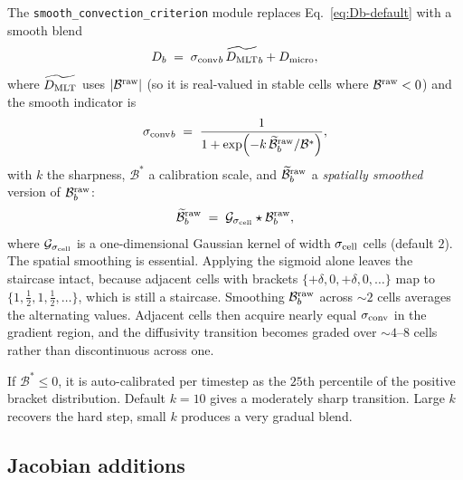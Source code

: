\documentclass{aastex631}
\newcommand{\Dmlt}{D_{\rm MLT}}
\newcommand{\Dmicro}{D_{\rm micro}}
\newcommand{\sigmaconv}{\sigma_{\rm conv}}
\newcommand{\bracketraw}{\mathcal{B}^{\rm raw}}
\newcommand{\bracketsm}{\widetilde{\mathcal{B}}^{\rm raw}}
\newcommand{\bracketstar}{\mathcal{B}^{*}}
\begin{document}
The \texttt{smooth\_convection\_criterion} module replaces
Eq.~\ref{eq:Db-default} with a smooth blend
\begin{equation}
D_b \;=\; \sigmaconv{}_b\, \widetilde{\Dmlt}_b + \Dmicro,
\label{eq:Db-blend}
\end{equation}
where $\widetilde{\Dmlt}$ uses $|\bracketraw|$ (so it is real-valued
in stable cells where $\bracketraw < 0$) and the smooth indicator is
\begin{equation}
\sigmaconv{}_b
    \;=\; \frac{1}{1 + \exp\!\left(-k\,\bracketsm_b/\bracketstar\right)},
\label{eq:sigma-conv}
\end{equation}
with $k$ the sharpness, $\bracketstar$ a calibration scale, and
$\bracketsm_b$ a \emph{spatially smoothed} version of
$\bracketraw_b$:
\begin{equation}
\bracketsm_b \;=\; \mathcal{G}_{\sigma_{\rm cell}} \star \bracketraw_b,
\label{eq:bracket-smooth}
\end{equation}
where $\mathcal{G}_{\sigma_{\rm cell}}$ is a one-dimensional Gaussian
kernel of width $\sigma_{\rm cell}$ cells (default $2$).  The
spatial smoothing is essential.  Applying the sigmoid alone leaves the
staircase intact, because adjacent cells with brackets
$\{+\delta, 0, +\delta, 0, \ldots\}$ map to
$\{1, \tfrac{1}{2}, 1, \tfrac{1}{2}, \ldots\}$, which is still a
staircase.  Smoothing $\bracketraw_b$ across $\sim 2$ cells averages
the alternating values.  Adjacent cells then acquire nearly equal
$\sigmaconv$ in the gradient region, and the diffusivity transition
becomes graded over $\sim 4$--$8$ cells rather than discontinuous
across one.

If $\bracketstar \le 0$, it is auto-calibrated per timestep as the
$25$th percentile of the positive bracket distribution.  Default
$k = 10$ gives a moderately sharp transition.  Large $k$ recovers the
hard step, small $k$ produces a very gradual blend.

\subsection{Jacobian additions}
\end{document}
